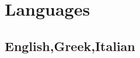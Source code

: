 \documentclass[letterpaper]{twentysecondcv} %
\begin{document}

\section{Languages}

\subsection{English,Greek,Italian}











\end{document}
